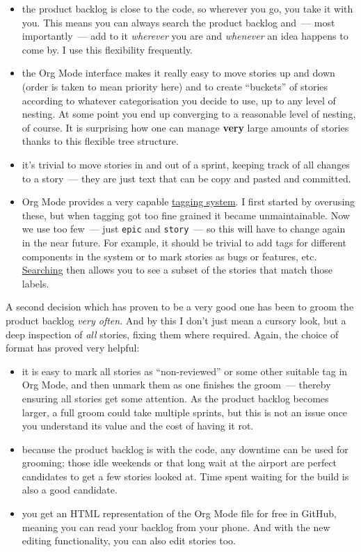 \documentclass{book}
\begin{document}
\begin{itemize}
\item the product backlog is close to the code, so wherever you go, you
take it with you. This means you can always search the product
backlog and~--- most importantly~--- add to it \emph{wherever} you are and
\emph{whenever} an idea happens to come by. I use this flexibility
frequently.
\item the Org Mode interface makes it really easy to move stories up and
down (order is taken to mean priority here) and to create ``buckets''
of stories according to whatever categorisation you decide to use,
up to any level of nesting. At some point you end up converging to a
reasonable level of nesting, of course. It is surprising how one can
manage \textbf{very} large amounts of stories thanks to this flexible tree
structure.
\item it's trivial to move stories in and out of a sprint, keeping track
of all changes to a story~--- they are just text that can be copy and
pasted and committed.
\item Org Mode provides a very capable
  \href{http://orgmode.org/manual/Tags.html}{tagging system}. I first
  started by overusing these, but when tagging got too fine grained it
  became unmaintainable. Now we use too few~--- just \texttt{epic} and
  \texttt{story}~--- so this will have to change again in the near
  future. For example, it should be trivial to add tags for different
  components in the system or to mark stories as bugs or features,
  etc. \href{http://orgmode.org/manual/Tag-searches.html#Tag-searches}{Searching}
  then allows you to see a subset of the stories that match those
  labels.
\end{itemize}

A second decision which has proven to be a very good one has been to
groom the product backlog \emph{very often}. And by this I don't just mean
a cursory look, but a deep inspection of \emph{all} stories, fixing them
where required. Again, the choice of format has proved very helpful:

\begin{itemize}
\item it is easy to mark all stories as ``non-reviewed'' or some other
suitable tag in Org Mode, and then unmark them as one finishes the
groom~--- thereby ensuring all stories get some attention. As the
product backlog becomes larger, a full groom could take multiple
sprints, but this is not an issue once you understand its value and
the cost of having it rot.
\item because the product backlog is with the code, any downtime can be
used for grooming; those idle weekends or that long wait at the
airport are perfect candidates to get a few stories looked at. Time
spent waiting for the build is also a good candidate.
\item you get an HTML representation of the Org Mode file for free in
GitHub, meaning you can read your backlog from your phone. And with
the new editing functionality, you can also edit stories too.
\end{itemize}
\end{document}
